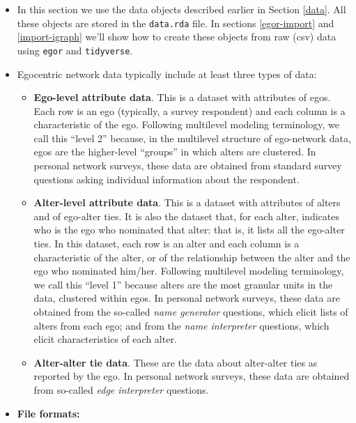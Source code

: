 \documentclass[
]{book}
\providecommand{\tightlist}{%
  \setlength{\itemsep}{0pt}\setlength{\parskip}{0pt}}
\begin{document}
\begin{itemize}
\tightlist
\item
  In this section we use the data objects described earlier in Section \ref{data}. All these objects are stored in the \texttt{data.rda} file. In sections \ref{egor-import} and \ref{import-igraph} we'll show how to create these objects from raw (csv) data using \texttt{egor} and \texttt{tidyverse}.
\item
  Egocentric network data typically include at least three types of data:

  \begin{itemize}
  \tightlist
  \item
    \textbf{Ego-level attribute data}. This is a dataset with attributes of egos. Each row is an ego (typically, a survey respondent) and each column is a characteristic of the ego. Following multilevel modeling terminology, we call this ``level 2'' because, in the multilevel structure of ego-network data, egos are the higher-level ``groups'' in which alters are clustered. In personal network surveys, these data are obtained from standard survey questions asking individual information about the respondent.
  \item
    \textbf{Alter-level attribute data}. This is a dataset with attributes of alters and of ego-alter ties. It is also the dataset that, for each alter, indicates who is the ego who nominated that alter: that is, it lists all the ego-alter ties. In this dataset, each row is an alter and each column is a characteristic of the alter, or of the relationship between the alter and the ego who nominated him/her. Following multilevel modeling terminology, we call this ``level 1'' because alters are the most granular units in the data, clustered within egos. In personal network surveys, these data are obtained from the so-called \emph{name generator} questions, which elicit lists of alters from each ego; and from the \emph{name interpreter} questions, which elicit characteristics of each alter.
  \item
    \textbf{Alter-alter tie data}. These are the data about alter-alter ties as reported by the ego. In personal network surveys, these data are obtained from so-called \emph{edge interpreter} questions.
  \end{itemize}
\item
  \textbf{File formats:}


\end{itemize}
\end{document}
